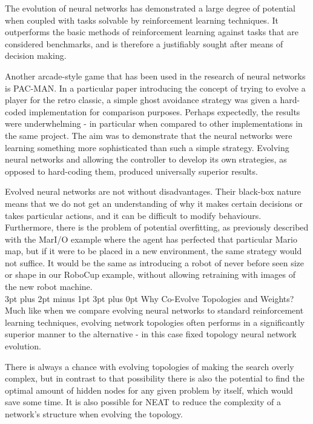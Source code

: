 \documentclass[12pt,a4paper]{article}
\makeatletter
\renewcommand\subsection{\@startsection {subsection}{1}{2mm} %
                               {3pt plus 2pt minus 1pt} %
                               {3pt plus 0pt} %
                               {\normalfont\bfseries}}
\makeatother
\begin{document}
The evolution of neural networks has demonstrated a large degree of potential when coupled with tasks solvable by reinforcement learning techniques\citep{EfficientEvolutionOfNeuralNetworkTopologies}. It outperforms the basic methods of reinforcement learning against tasks that are considered benchmarks, and is therefore a justifiably sought after means of decision making.

Another arcade-style game that has been used in the research of neural networks is PAC-MAN. In a particular paper introducing the concept of trying to evolve a player for the retro classic, a simple ghost avoidance strategy was given a hard-coded implementation for comparison purposes. Perhaps expectedly, the results were underwhelming - in particular when compared to other implementations in the same project. The aim was to demonstrate that the neural networks were learning something more sophisticated than such a simple strategy\citep{MSPacMan}. Evolving neural networks and allowing the controller to develop its own strategies, as opposed to hard-coding them, produced universally superior results.

Evolved neural networks are not without disadvantages. Their black-box nature means that we do not get an understanding of why it makes certain decisions or takes particular actions, and it can be difficult to modify behaviours. Furthermore, there is the problem of potential overfitting, as previously described with the MarI/O\citep{MarIO} example where the agent has perfected that particular Mario map, but if it were to be placed in a new environment, the same strategy would not suffice. It would be the same as introducing a robot of never before seen size or shape in our RoboCup\citep{24} example, without allowing retraining with images of the new robot machine.\\

\subsection{Why Co-Evolve Topologies and Weights?}
Much like when we compare evolving neural networks to standard reinforcement learning techniques, evolving network topologies often performs in a significantly superior manner to the alternative - in this case fixed topology neural network evolution\citep{EfficientEvolutionOfNeuralNetworkTopologies}. 

There is always a chance with evolving topologies of making the search overly complex, but in contrast to that possibility there is also the potential to find the optimal amount of hidden nodes for any given problem by itself, which would save some time\citep{EfficientEvolutionOfNeuralNetworkTopologies}. It is also possible for NEAT to reduce the complexity of a network's structure when evolving the topology. 
\end{document}
